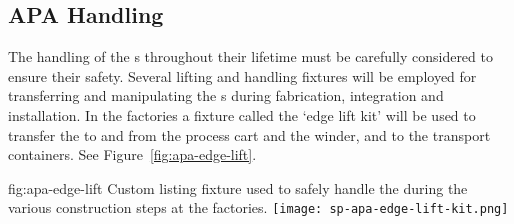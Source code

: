 

\subsection{APA Handling}
\label{sec:fdsp-apa-transport-handling}

The handling of the s throughout their lifetime must be carefully considered to ensure their safety.  Several lifting and handling fixtures will be employed for transferring and manipulating the s during fabrication, integration and installation.  In the factories a fixture called the `edge lift kit' will be used to transfer the  to and from the process cart and the winder, and to the transport containers.  See Figure~\ref{fig:apa-edge-lift}.  %

\begin{dunefigure}{fig:apa-edge-lift}
{Custom listing fixture used to safely handle the  during the various construction steps at the factories.}  
\texttt{[image: sp-apa-edge-lift-kit.png]} 
\end{dunefigure}






